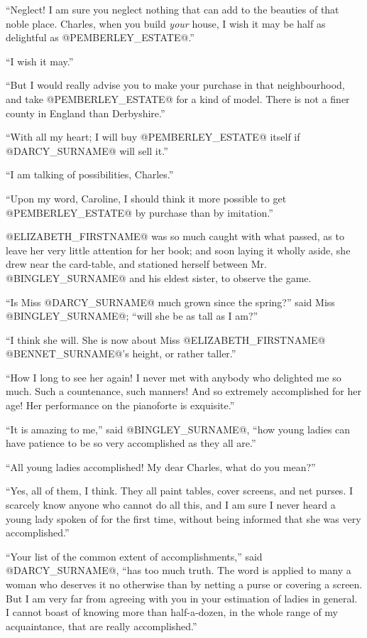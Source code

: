 ``Neglect! I am sure you neglect nothing that can add to the beauties of
that noble place. Charles, when you build \textit{your} house, I wish it may be
half as delightful as @PEMBERLEY_ESTATE@.''

``I wish it may.''

``But I would really advise you to make your purchase in that
neighbourhood, and take @PEMBERLEY_ESTATE@ for a kind of model. There is not a
finer county in England than Derbyshire.''

``With all my heart; I will buy @PEMBERLEY_ESTATE@ itself if @DARCY_SURNAME@ will sell it.''

``I am talking of possibilities, Charles.''

``Upon my word, Caroline, I should think it more possible to get
@PEMBERLEY_ESTATE@ by purchase than by imitation.''

@ELIZABETH_FIRSTNAME@ was so much caught with what passed, as to leave her very
little attention for her book; and soon laying it wholly aside, she drew
near the card-table, and stationed herself between Mr. @BINGLEY_SURNAME@ and his
eldest sister, to observe the game.

``Is Miss @DARCY_SURNAME@ much grown since the spring?'' said Miss @BINGLEY_SURNAME@; ``will
she be as tall as I am?''

``I think she will. She is now about Miss @ELIZABETH_FIRSTNAME@ @BENNET_SURNAME@'s height, or
rather taller.''

``How I long to see her again! I never met with anybody who delighted me
so much. Such a countenance, such manners! And so extremely accomplished
for her age! Her performance on the pianoforte is exquisite.''

``It is amazing to me,'' said @BINGLEY_SURNAME@, ``how young ladies can have patience
to be so very accomplished as they all are.''

``All young ladies accomplished! My dear Charles, what do you mean?''

``Yes, all of them, I think. They all paint tables, cover screens, and
net purses. I scarcely know anyone who cannot do all this, and I am sure
I never heard a young lady spoken of for the first time, without being
informed that she was very accomplished.''

``Your list of the common extent of accomplishments,'' said @DARCY_SURNAME@, ``has
too much truth. The word is applied to many a woman who deserves it no
otherwise than by netting a purse or covering a screen. But I am very
far from agreeing with you in your estimation of ladies in general. I
cannot boast of knowing more than half-a-dozen, in the whole range of my
acquaintance, that are really accomplished.''

